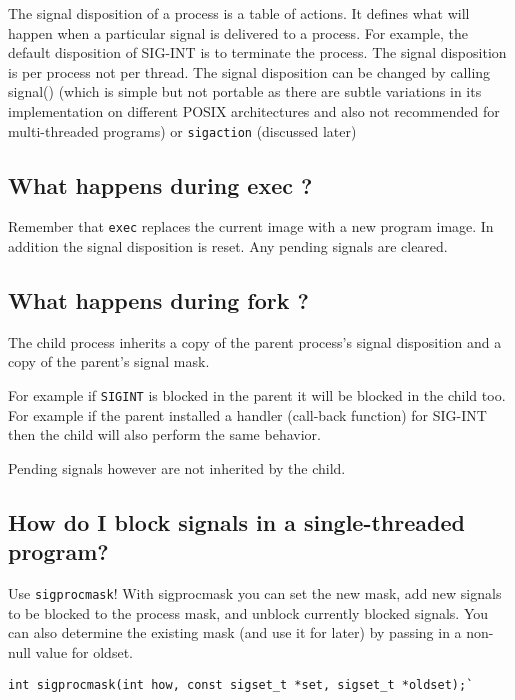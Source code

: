 The signal disposition of a process is a table of actions. It defines
what will happen when a particular signal is delivered to a process. For
example, the default disposition of SIG-INT is to terminate the process.
The signal disposition is per process not per thread. The signal
disposition can be changed by calling signal() (which is simple but not
portable as there are subtle variations in its implementation on
different POSIX architectures and also not recommended for
multi-threaded programs) or \texttt{sigaction} (discussed later)

\subsection{What happens during exec ?}\label{what-happens-during-exec}

Remember that \texttt{exec} replaces the current image with a new
program image. In addition the signal disposition is reset. Any pending
signals are cleared.

\subsection{What happens during fork ?}\label{what-happens-during-fork}

The child process inherits a copy of the parent process's signal
disposition and a copy of the parent's signal mask.

For example if \texttt{SIGINT} is blocked in the parent it will be
blocked in the child too.\\For example if the parent installed a handler
(call-back function) for SIG-INT then the child will also perform the
same behavior.

Pending signals however are not inherited by the child.

\subsection{How do I block signals in a single-threaded
program?}\label{how-do-i-block-signals-in-a-single-threaded-program}

Use \texttt{sigprocmask}! With sigprocmask you can set the new mask, add
new signals to be blocked to the process mask, and unblock currently
blocked signals. You can also determine the existing mask (and use it
for later) by passing in a non-null value for oldset.

\begin{verbatim}
int sigprocmask(int how, const sigset_t *set, sigset_t *oldset);`
\end{verbatim}

